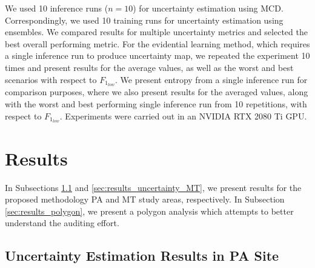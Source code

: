 We used 10 inference runs ($n=10$) for uncertainty estimation using MCD. Correspondingly, we used 10 training runs for uncertainty estimation using ensembles. We compared results for multiple uncertainty metrics and selected the best overall performing metric. For the evidential learning method, which requires a single inference run to produce uncertainty map, we repeated the experiment 10 times and present results for the average values, as well as the worst and best scenarios with respect to $F_{1_{low}}$. 
We present entropy from a single inference run for comparison purposes, where we also present results for the averaged values, along with the worst and best performing single inference run from 10 repetitions, with respect to $F_{1_{low}}$. %
Experiments were carried out in an NVIDIA RTX 2080 Ti GPU.  




\section{Results}
\label{sec:results}

In Subsections \ref{sec:results_uncertainty_PA} and \ref{sec:results_uncertainty_MT}, we present results for the proposed methodology PA and MT study areas, respectively. In Subsection \ref{sec:results_polygon}, we present a polygon analysis which attempts to better understand the auditing effort.




\subsection{Uncertainty Estimation Results in PA Site}\label{sec:results_uncertainty_PA}


